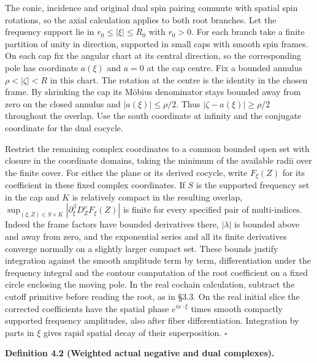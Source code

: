 \documentclass[
  english,
  11pt,
  reqno]{amsart}
\makeatletter
\newcommand{\pandocstatementheading}[1]{%
  \par\if@nobreak\else
    \addpenalty{\@beginparpenalty}%
    \addvspace{.5\baselineskip plus .2\baselineskip minus .2\baselineskip}%
  \fi
  {\normalfont\bfseries #1\par}%
  \nobreak\@afterindenttrue\@afterheading
}
\makeatother
\begin{document}
The conic, incidence and original dual spin pairing commute with spatial
spin rotations, so the axial calculation applies to both root branches.
Let the frequency support lie in \(r_0\le |\xi|\le R_0\) with \(r_0>0\).
For each branch take a finite partition of unity in direction, supported
in small caps with smooth spin frames. On each cap fix the angular chart
at its central direction, so the corresponding pole has coordinate
\(a(\xi)\) and \(a=0\) at the cap centre. Fix a bounded annulus
\(\rho<|\zeta|<R\) in this chart. The rotation at the centre is the
identity in the chosen frame. By shrinking the cap its Möbius
denominator stays bounded away from zero on the closed annulus and
\(|a(\xi)|\le\rho/2\). Thus \(|\zeta-a(\xi)|\ge\rho/2\) throughout the
overlap. Use the south coordinate at infinity and the conjugate
coordinate for the dual cocycle.

Restrict the remaining complex coordinates to a common bounded open set
with closure in the coordinate domains, taking the minimum of the
available radii over the finite cover. For either the plane or its
derived cocycle, write \(F_\xi(Z)\) for its coefficient in these fixed
complex coordinates. If \(S\) is the supported frequency set in the cap
and \(K\) is relatively compact in the resulting overlap,
\(\sup_{(\xi,Z)\in S\times K}|\partial_\xi^\beta D_Z^\nu F_\xi(Z)|\) is
finite for every specified pair of multi-indices. Indeed the frame
factors have bounded derivatives there, \(|\lambda|\) is bounded above
and away from zero, and the exponential series and all its finite
derivatives converge normally on a slightly larger compact set. These
bounds justify integration against the smooth amplitude term by term,
differentiation under the frequency integral and the contour computation
of the root coefficient on a fixed circle enclosing the moving pole. In
the real cochain calculation, subtract the cutoff primitive before
reading the root, as in §3.3. On the real initial slice the corrected
coefficients have the spatial phase \(e^{ix\cdot\xi}\) times smooth
compactly supported frequency amplitudes, also after fiber
differentiation. Integration by parts in \(\xi\) gives rapid spatial
decay of their superposition. \hfill\(\square\)

\pandocstatementheading{\leavevmode{}\label{def:online-negative-dual-weighted-complexes}Definition 4.2 (Weighted actual negative and dual complexes).}
\end{document}
